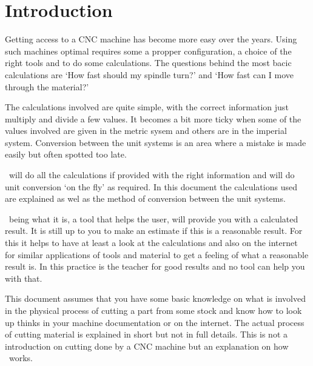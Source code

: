 \chapter{Introduction}\label{Introduction}

Getting access to a CNC machine has become more easy over the years.
Using such machines optimal requires some a propper configuration, a choice of the right tools
and to do some calculations. The questions behind the most bacic calculations are `How fast should
my spindle turn?' and `How fast can I move through the material?'

The calculations involved are quite simple, with the correct information just multiply and divide
a few values. It becomes a bit more ticky when some of the values involved are given in
the metric sysem and others are in the imperial system. Conversion between the unit systems is
an area where a mistake is made easily but often spotted too late.

\CC\ will do all the calculations if provided with the right information and will do
unit conversion `on the fly' as required. In this document the calculations used are explained
as wel as the method of conversion between the unit systems.

\CC\ being what it is, a tool that helps the user, will provide you with a calculated
result. It is still up to you to make an estimate if this is a reasonable result. For this it
helps to have at least a look at the calculations and also on the internet for similar applications
of tools and material to get a feeling of what a reasonable result is. In this practice is the
teacher for good results and no tool can help you with that.

This document assumes that you have some basic knowledge on what is involved in the physical process
of cutting a part from some stock and know how to look up thinks in your machine documentation or
on the internet. The actual process of cutting material is explained in short but not in full details.
This is not a introduction on cutting done by a CNC machine but an explanation on how \CC\ works.

